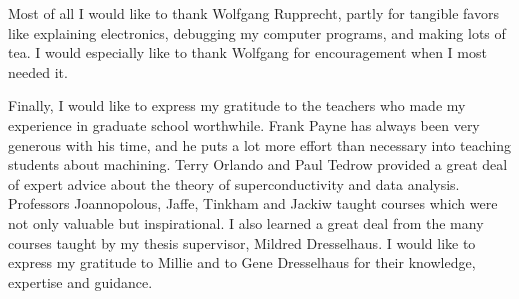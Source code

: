         Most of all I would like to  thank Wolfgang  Rupprecht,  partly for
tangible   favors   like  explaining electronics,   debugging  my  computer
programs,  and making lots  of  tea.  I would  especially   like  to  thank
Wolfgang for encouragement when I most needed it.

        Finally, I would like to express my  gratitude to  the teachers who
made my experience in graduate school  worthwhile.  Frank  Payne has always
been very generous  with his time, and  he  puts  a lot   more  effort than
necessary into teaching  students about  machining.  Terry Orlando and Paul
Tedrow  provided  a great  deal   of expert  advice   about  the  theory of
superconductivity and data  analysis.    Professors  Joannopolous,   Jaffe,
Tinkham and  Jackiw taught  courses    which were not  only  valuable   but
inspirational.  I also learned a great deal from the many courses taught by
my thesis  supervisor, Mildred  Dresselhaus.   I would  like  to express my
gratitude to Millie and to Gene Dresselhaus  for their knowledge, expertise
and guidance.
